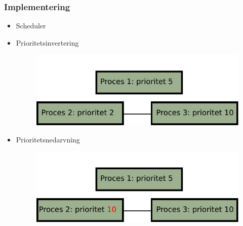 \documentclass[12pt]{beamer}
\begin{document}
\begin{frame}
  \frametitle{Implementering}
  \begin{itemize}   
    \item Scheduler 
	\item Prioritetsinvertering
  \begin{figure}
  \begin{center}
  \includegraphics[scale=0.75]{prioritetsinvertering}
  \end{center}
  \end{figure}

	\item Prioritetsnedarvning
  \begin{figure}
  \begin{center}
  \includegraphics[scale=0.75]{prioritetsnedarvning}
  \end{center}
  \end{figure}

  \end{itemize}
\end{frame}

\end{document}

